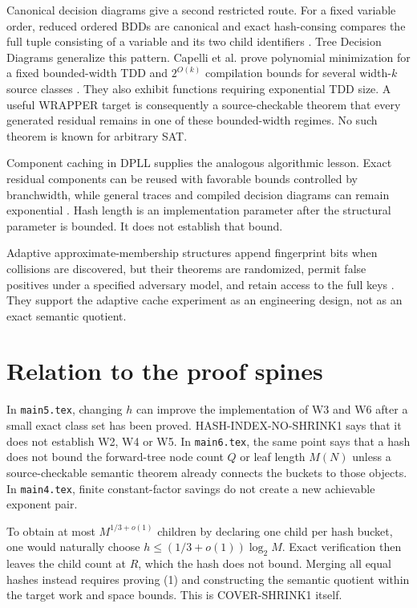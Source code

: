 \documentclass[11pt]{article}
\begin{document}
Canonical decision diagrams give a second restricted route.  For a fixed
variable order, reduced ordered BDDs are canonical and exact hash-consing
compares the full tuple consisting of a variable and its two child identifiers
\cite{bryant1986}.  Tree Decision Diagrams generalize this pattern.  Capelli
et al. prove polynomial minimization for a fixed bounded-width TDD and
$2^{O(k)}$ compilation bounds for several width-$k$ source classes
\cite{capelli2026}.  They also exhibit functions requiring exponential TDD
size.  A useful WRAPPER target is consequently a source-checkable theorem
that every generated residual remains in one of these bounded-width regimes.
No such theorem is known for arbitrary SAT.

Component caching in DPLL supplies the analogous algorithmic lesson.
Exact residual components can be reused with favorable bounds controlled by
branchwidth, while general traces and compiled decision diagrams can remain
exponential \cite{bacchusdalmaopitassi2014}.  Hash length is an implementation
parameter after the structural parameter is bounded.  It does not establish
that bound.

Adaptive approximate-membership structures append fingerprint bits when
collisions are discovered, but their theorems are randomized, permit false
positives under a specified adversary model, and retain access to the full
keys \cite{benderetal2018}.  They support the adaptive cache experiment as an
engineering design, not as an exact semantic quotient.

\section{Relation to the proof spines}
In \texttt{main5.tex}, changing $h$ can improve the implementation of W3 and
W6 after a small exact class set has been proved.  HASH-INDEX-NO-SHRINK1 says
that it does not establish W2, W4 or W5.  In \texttt{main6.tex}, the same
point says that a hash does not bound the forward-tree node count $Q$ or leaf
length $M(N)$ unless a source-checkable semantic theorem already connects
the buckets to those objects.  In \texttt{main4.tex}, finite constant-factor
savings do not create a new achievable exponent pair.

To obtain at most $M^{1/3+o(1)}$ children by declaring one child per hash
bucket, one would naturally choose
$h\le(1/3+o(1))\log_2M$.  Exact verification then leaves the child count at
$R$, which the hash does not bound.  Merging all equal hashes instead requires
proving (1) and constructing the semantic quotient within the target work and
space bounds.  This is COVER-SHRINK1 itself.
\end{document}
